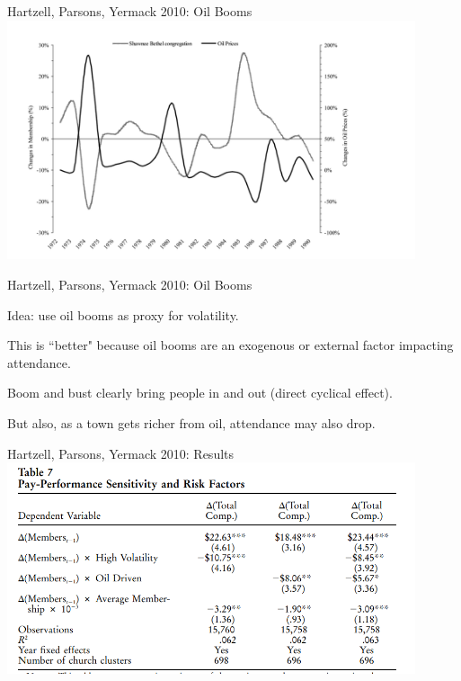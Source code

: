 \documentclass[aspectratio=169,usenames,dvipsnames]{beamer}
\newenvironment{wideitemize}{\itemize\addtolength{\itemsep}{10pt}}{\enditemize}
\begin{document}
\begin{frame}[c]{Hartzell, Parsons, Yermack 2010: Oil Booms}
\centering
\includegraphics[width=0.9\textwidth]{pictures/oilboom.png}
\end{frame}


\begin{frame}{Hartzell, Parsons, Yermack 2010: Oil Booms}
\begin{wideitemize}
    \item Idea: use oil booms as proxy for volatility.
    \item This is ``better" because oil booms are an exogenous or external factor impacting attendance.
    \item Boom and bust clearly bring people in and out (direct cyclical effect).
    \item But also, as a town gets richer from oil, attendance may also drop.
\end{wideitemize}
\end{frame}


\begin{frame}[c]{Hartzell, Parsons, Yermack 2010: Results}
\centering
\includegraphics[width=0.9\textwidth]{pictures/oil_paytable.png}
\end{frame}
\end{document}
